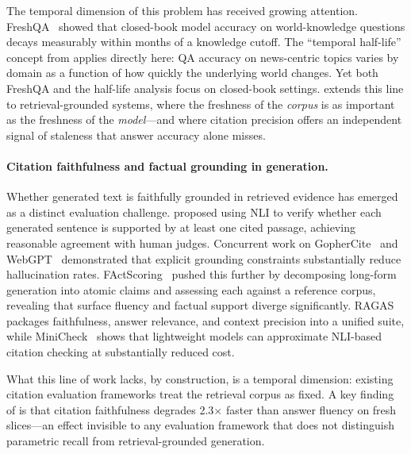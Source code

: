 The temporal dimension of this problem has received growing attention. FreshQA~\citep{vu2023freshqa} showed that closed-book model accuracy on world-knowledge questions decays measurably within months of a knowledge cutoff. The ``temporal half-life'' concept from \citet{kasner2024beyond} applies directly here: QA accuracy on news-centric topics varies by domain as a function of how quickly the underlying world changes. Yet both FreshQA and the half-life analysis focus on closed-book settings. \method{} extends this line to retrieval-grounded systems, where the freshness of the \emph{corpus} is as important as the freshness of the \emph{model}---and where citation precision offers an independent signal of staleness that answer accuracy alone misses.

\paragraph{Citation faithfulness and factual grounding in generation.}
Whether generated text is faithfully grounded in retrieved evidence has emerged as a distinct evaluation challenge. \citet{gao2023enabling} proposed using NLI to verify whether each generated sentence is supported by at least one cited passage, achieving reasonable agreement with human judges. Concurrent work on GopherCite~\citep{menick2022gophercite} and WebGPT~\citep{nakano2021webgpt} demonstrated that explicit grounding constraints substantially reduce hallucination rates. FActScoring~\citep{min2023factscore} pushed this further by decomposing long-form generation into atomic claims and assessing each against a reference corpus, revealing that surface fluency and factual support diverge significantly. RAGAS~\citep{es2023ragas} packages faithfulness, answer relevance, and context precision into a unified suite, while MiniCheck~\citep{tang2024minicheck} shows that lightweight models can approximate NLI-based citation checking at substantially reduced cost.

What this line of work lacks, by construction, is a temporal dimension: existing citation evaluation frameworks treat the retrieval corpus as fixed. A key finding of \method{} is that citation faithfulness degrades 2.3$\times$ faster than answer fluency on fresh slices---an effect invisible to any evaluation framework that does not distinguish parametric recall from retrieval-grounded generation.

